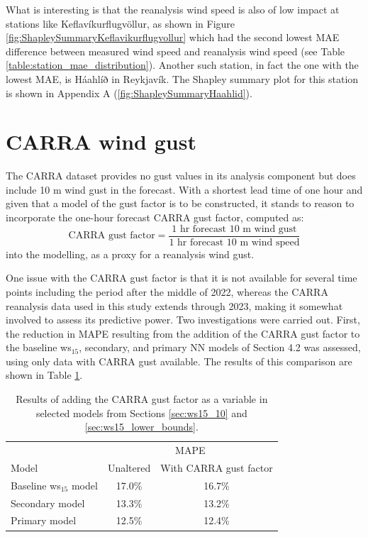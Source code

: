 What is interesting is that the reanalysis wind speed is also of low impact at stations like Keflavíkurflugvöllur, as shown in Figure \ref{fig:ShapleySummaryKeflavikurflugvollur} which had the second lowest MAE difference between measured wind speed and reanalysis wind speed (see Table \ref{table:station_mae_distribution}). Another such station, in fact the one with the lowest MAE, is Háahlíð in Reykjavík. The Shapley summary plot for this station is shown in Appendix A (\ref{fig:ShapleySummaryHaahlid}).

\section{CARRA wind gust}

The CARRA dataset provides no gust values in its analysis component but does include 10 m wind gust in the forecast. With a shortest lead time of one hour and given that a model of the gust factor is to be constructed, it stands to reason to incorporate the one-hour forecast CARRA gust factor, computed as:
\begin{equation*}
\text{CARRA gust factor} = \dfrac
{\text{1 hr forecast 10 m wind gust}}
{\text{1 hr forecast 10 m wind speed}}
\end{equation*}
into the modelling, as a proxy for a reanalysis wind gust.

One issue with the CARRA gust factor is that it is not available for several time points including the period after the middle of 2022, whereas the CARRA reanalysis data used in this study extends through 2023, making it somewhat involved to assess its predictive power. Two investigations were carried out. First, the reduction in MAPE resulting from the addition of the CARRA gust factor to the baseline ws$_{15}$, secondary, and primary NN models of Section 4.2 was assessed, using only data with CARRA gust available. The results of this comparison are shown in Table \ref{table:carra_gust}.

\begin{table}[h]
  \centering
  \caption[Results adding CARRA gust factor]{Results of adding the CARRA gust factor as a variable in selected models from Sections \ref{sec:ws15_10} and \ref{sec:ws15_lower_bounds}.}
  \label{table:carra_gust}
  \begin{tabular}{lcc}
    \toprule
    & \multicolumn{2}{c}{MAPE\qquad\qquad} \\
    Model & Unaltered & With CARRA gust factor \\
    \midrule
    Baseline ws$_{15}$ model & 17.0\% & 16.7\% \\
    Secondary model           & 13.3\% & 13.2\% \\
    Primary model             & 12.5\% & 12.4\% \\
    \bottomrule
  \end{tabular}
\end{table}

